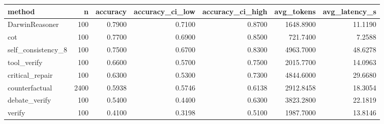 \begin{tabular}{lrrrrrr}
\toprule
method & n & accuracy & accuracy_ci_low & accuracy_ci_high & avg_tokens & avg_latency_s \\
\midrule
DarwinReasoner & 100 & 0.7900 & 0.7100 & 0.8700 & 1648.8900 & 11.1190 \\
cot & 100 & 0.7700 & 0.6900 & 0.8500 & 721.7400 & 7.2588 \\
self_consistency_8 & 100 & 0.7500 & 0.6700 & 0.8300 & 4963.7000 & 48.6278 \\
tool_verify & 100 & 0.6600 & 0.5700 & 0.7500 & 2015.7700 & 14.0963 \\
critical_repair & 100 & 0.6300 & 0.5300 & 0.7300 & 4844.6000 & 29.6680 \\
counterfactual & 2400 & 0.5938 & 0.5746 & 0.6138 & 2912.8458 & 18.3054 \\
debate_verify & 100 & 0.5400 & 0.4400 & 0.6300 & 3823.2800 & 22.1819 \\
verify & 100 & 0.4100 & 0.3198 & 0.5100 & 1987.7000 & 13.8146 \\
\bottomrule
\end{tabular}

